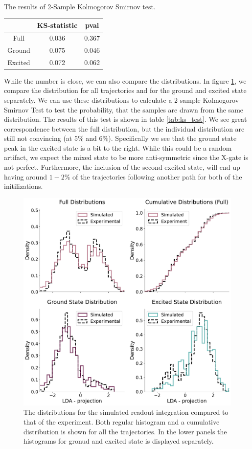\begin{margintable}[- 1 cm]
    \caption{The results of 2-Sample Kolmogorov Smirnov test.}
    \centering
    \begin{tabular}{c|cc}
                & KS-statistic & pval  \\ \hline
    Full        & 0.036 & 0.367         \\
    Ground      & 0.075 & 0.046         \\
    Excited     & 0.072 & 0.062
    \end{tabular}
    \label{tab:ks_test}
\end{margintable}
While the number is close, we can also compare the distributions. In figure \ref{fig:distributions_for_ks}, we compare the distribution for all trajectories and for the ground and excited state separately. We can use these distributions to calculate a 2 sample Kolmogorov Smirnov Test\cite{panchenko_lecture_nodate} to test the probability, that the samples are drawn from the same distribution. The results of this test is shown in table \ref{tab:ks_test}. We see great correspondence between the full distribution, but the individual distribution are still not convincing (at $5 \%$ and $6\%$). Specifically we see that the ground state peak in the excited state is a bit to the right. While this could be a random artifact, we expect the mixed state to be more anti-symmetric since the X-gate is not perfect. Furthermore, the inclusion of the second excited state, will end up having around $1-2 \%$ of the trajectories following another path for both of the initilizations.


\begin{figure}
    \centering
    \includegraphics{Readout/Figs/Weighted_comparison_with_simmulation.pdf}
    \caption{The distributions for the simulated readout integration compared to that of the experiment. Both regular histogram and a cumulative distribution is shown for all the trajectories. In the lower panels the histograms for gronud and excited state is displayed separately. }
    \label{fig:distributions_for_ks}
\end{figure}
